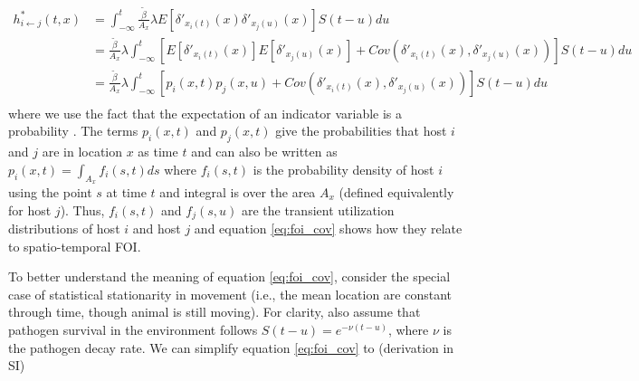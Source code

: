 \documentclass[letterpaper]{article}
\begin{document}
\begin{equation}
    \begin{aligned}
        h^*_{i \leftarrow j}(t, x) &= \int_{-\infty}^{t} \frac{\tilde{\beta}}{A_x} \lambda E[\delta'_{x_i(t)}(x) \delta'_{x_j(u)}(x)] S(t - u) du \\
        &= \frac{\tilde{\beta}}{A_x} \lambda \int_{-\infty}^{t} [E[\delta'_{x_i(t)}(x)] E[\delta'_{x_j(u)}(x)] + Cov(\delta'_{x_i(t)}(x), \delta'_{x_j(u)}(x))] S(t - u) du \\
        &= \frac{\tilde{\beta}}{A_x} \lambda \int_{-\infty}^{t} [p_i(x, t) p_j(x, u) + Cov(\delta'_{x_i(t)}(x), \delta'_{x_j(u)}(x))] S(t - u) du \\
    \end{aligned}
    \label{eq:foi_cov}
\end{equation}
where we use the fact that the expectation of an indicator variable is a probability \citep{Grimmett2001}. The terms $p_i(x, t)$ and $p_j(x, t)$ give the probabilities that host $i$ and $j$ are in location $x$ as time $t$ and can also be written as $p_i(x, t) = \int_{A_x} f_i(s, t) ds$ where $f_i(s, t)$ is the probability density of host $i$ using the point $s$ at time $t$ and integral is over the area $A_x$ (defined equivalently for host $j$). Thus, $f_i(s, t)$ and $f_j(s, u)$ are the transient utilization distributions of host $i$ and host $j$ and equation \ref{eq:foi_cov} shows how they relate to spatio-temporal FOI.



To better understand the meaning of equation \ref{eq:foi_cov}, consider the special case of statistical stationarity in movement (i.e., the mean location are constant through time, though animal is still moving).  
For clarity, also assume that pathogen survival in the environment follows $S(t - u) = e^{-\nu (t - u)}$, where $\nu$ is the pathogen decay rate.  We  can simplify equation \ref{eq:foi_cov} to (derivation in SI)
\end{document}
